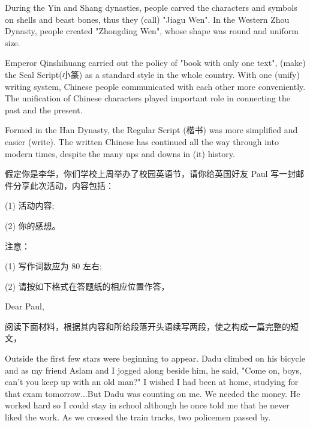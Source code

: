 \documentclass{英语试卷}
\begin{document}
\par During the Yin and Shang dynasties, people carved the characters and symbols on shells and beast bones, thus they  (call) "Jiagu Wen". In the Western Zhou Dynasty, people created "Zhongding Wen", whose shape was round and uniform  size.\par
\par Emperor Qinshihuang carried out the policy of "book with only one text", (make) the Seal Script(小篆) as a standard style in the whole country. With one (unify) writing system, Chinese people communicated with each other more conveniently. The unification of Chinese characters played  important role in connecting the past and the present.\par
\par Formed in the Han Dynasty, the Regular Script (楷书) was more simplified and easier  (write). The written Chinese has continued all the way through into modern times, despite the many ups and downs in (it) history.\par
{}
\par 假定你是李华，你们学校上周举办了校园英语节，请你给英国好友 Paul 写一封邮件分享此次活动，内容包括：\par
\par (1) 活动内容;\par
\par (2) 你的感想。\par
\par 注意：\par
\par (1) 写作词数应为 80 左右;\par
\par (2) 请按如下格式在答题纸的相应位置作答，\par
\par Dear Paul,\par
{}
\par 阅读下面材料，根据其内容和所给段落开头语续写两段，使之构成一篇完整的短文，\par
\par Outside the first few stars were beginning to appear. Dadu climbed on his bicycle and as my friend Aslam and I jogged along beside him, he said, "Come on, boys, can't you keep up with an old man?" I wished I had been at home, studying for that exam tomorrow...But Dadu was counting on me. We needed the money. He worked hard so I could stay in school although he once told me that he never liked the work. As we crossed the train tracks, two policemen passed by.\par
\end{document}
